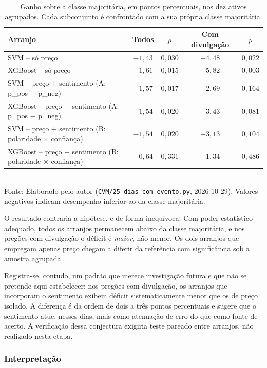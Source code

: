 \begin{table}[htpb]
\centering
\caption{Ganho sobre a classe majoritária, em pontos percentuais, nos dez ativos agrupados. Cada subconjunto é confrontado com a sua própria classe majoritária.}
\label{tab:evento_agrupado}
\begin{tabular}{l c c c c}
\hline
\textbf{Arranjo} & \textbf{Todos} & \textbf{$p$} & \textbf{Com divulgação} & \textbf{$p$} \\ \hline
SVM -- só preço & $-1{,}43$ & $0{,}030$ & $-4{,}48$ & $0{,}022$ \\
XGBoost -- só preço & $-1{,}61$ & $0{,}015$ & $-5{,}82$ & $0{,}003$ \\
SVM -- preço + sentimento (A: p\_pos − p\_neg) & $-1{,}57$ & $0{,}017$ & $-2{,}69$ & $0{,}164$ \\
XGBoost -- preço + sentimento (A: p\_pos − p\_neg) & $-1{,}54$ & $0{,}020$ & $-3{,}43$ & $0{,}081$ \\
SVM -- preço + sentimento (B: polaridade × confiança) & $-1{,}54$ & $0{,}020$ & $-3{,}13$ & $0{,}104$ \\
XGBoost -- preço + sentimento (B: polaridade × confiança) & $-0{,}64$ & $0{,}331$ & $-1{,}34$ & $0{,}486$ \\
\hline
\end{tabular}
\vspace{0.2cm}
{\small \\ Fonte: Elaborado pelo autor (\texttt{CVM/25\_dias\_com\_evento.py}, 2026-10-29). Valores negativos indicam desempenho inferior ao da classe majoritária.}
\end{table}

O resultado contraria a hipótese, e de forma inequívoca. Com poder estatístico adequado, todos os
arranjos permanecem abaixo da classe majoritária, e nos pregões com divulgação o déficit é
\emph{maior}, não menor. Os dois arranjos que empregam apenas preço chegam a diferir da referência
com significância sob a amostra agrupada.

Registra-se, contudo, um padrão que merece investigação futura e que não se pretende aqui
estabelecer: nos pregões com divulgação, os arranjos que incorporam o sentimento exibem déficit
sistematicamente menor que os de preço isolado. A diferença é da ordem de dois a três pontos
percentuais e sugere que o sentimento atue, nesses dias, mais como atenuação de erro do que como
fonte de acerto. A verificação dessa conjectura exigiria teste pareado entre arranjos, não
realizado nesta etapa.

\subsubsection{Interpretação}

